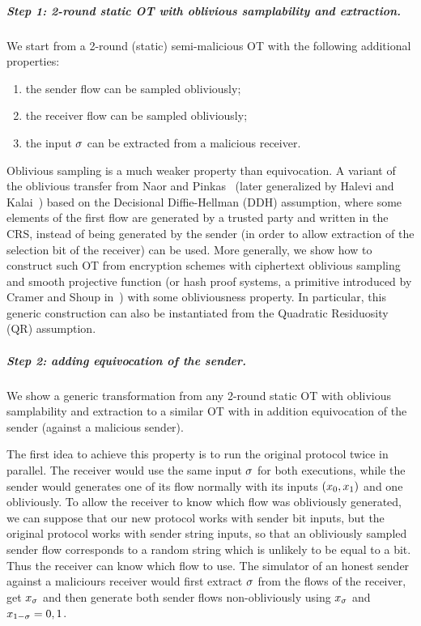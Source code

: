 \subparagraph{Step 1: 2-round static OT with oblivious samplability and extraction.}
We start from a 2-round (static) semi-malicious OT with the following additional properties:
\begin{enumerate}
\item the sender flow can be sampled obliviously;
\item the receiver flow can be sampled obliviously;
\item the input $\sigma$ can be extracted from a malicious receiver.
\end{enumerate}
Oblivious sampling is a much weaker property than equivocation.
A variant of the oblivious transfer from Naor and Pinkas~\cite{SODA:NaoPin01} (later generalized by Halevi and Kalai~\cite{JC:HalKal12}) based on the Decisional Diffie-Hellman (DDH) assumption, where some elements of the first flow are generated by a trusted party and written in the CRS, instead of being generated by the sender (in order to allow extraction of the selection bit of the receiver) can be used.
More generally, we show how to construct such OT from encryption schemes with ciphertext oblivious sampling and smooth projective function (or hash proof systems, a primitive introduced by Cramer and Shoup in~\cite{EC:CraSho02}) with some obliviousness property.
In particular, this generic construction can also be instantiated from the Quadratic Residuosity (QR) assumption.

\subparagraph{Step 2: adding equivocation of the sender.}
We show a generic transformation from any 2-round static OT with oblivious samplability and extraction to a similar OT with in addition equivocation of the sender (against a malicious sender).

The first idea to achieve this property is to run the original protocol twice in parallel.
The receiver would use the same input $\sigma$ for both executions, while the sender would generates one of its flow normally with its inputs $(x_0,x_1)$ and one obliviously.
To allow the receiver to know which flow was obliviously generated, we can suppose that our new protocol works with sender bit inputs, but the original protocol works with sender string inputs, so that an obliviously sampled sender flow corresponds to a random string which is unlikely to be equal to a bit. Thus the receiver can know which flow to use.
The simulator of an honest sender against a maliciours receiver would first extract $\sigma$ from the flows of the receiver, get $x_\sigma$ and then generate both sender flows non-obliviously using $x_\sigma$ and $x_{1-\sigma}=0,1$.


